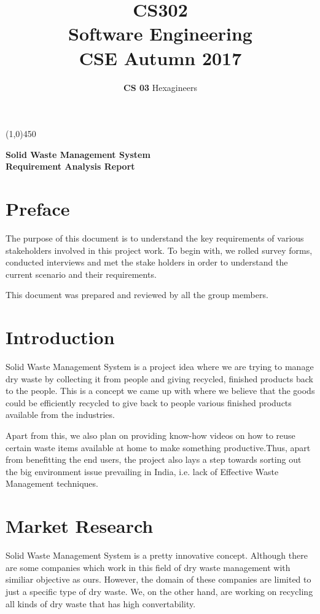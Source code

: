 \documentclass{article}
\title{\textbf{CS302}\\\HUGE Software Engineering\\
\LARGE CSE\hspace{\labelsep}\textbullet\hspace{\labelsep} Autumn 2017
}
\author{\textbf{CS 03} Hexagineers}
\begin{document}
\maketitle
\line(1,0){450}

\begin{center}

\Huge\textbf{Solid Waste Management System}\\
\Large \textbf{Requirement Analysis Report}
\end{center}
\newpage
\tableofcontents
\newpage
\section{Preface}
\par The purpose of this document is to understand the key requirements of various stakeholders involved in this project work. To begin with, we rolled survey forms, conducted interviews and met the stake holders in order to understand the current scenario and their requirements. 
\par This document was prepared and reviewed by all the group members.
\newpage
\section{Introduction}
\par Solid Waste Management System is a project idea where we are trying to manage dry waste by collecting it from people and giving recycled, finished products back to the people. This is a concept we came up with where we believe that the goods could be efficiently recycled to give back to people various finished products available from the industries. 
\par Apart from this, we also plan on providing know-how videos on how to reuse certain waste items available at home to make something productive.Thus, apart from benefitting the end users, the project also lays a step towards sorting out the big environment issue prevailing in India, i.e. lack of Effective Waste Management techniques.

\section{Market Research}
\par Solid Waste Management System is a pretty innovative concept. Although there are some companies which work in this field of dry waste management with similiar objective as ours. However, the domain of these companies are limited to just a specific type of dry waste.
We, on the other hand, are working on recycling all kinds of dry waste that has high convertability. 
\end{document}
